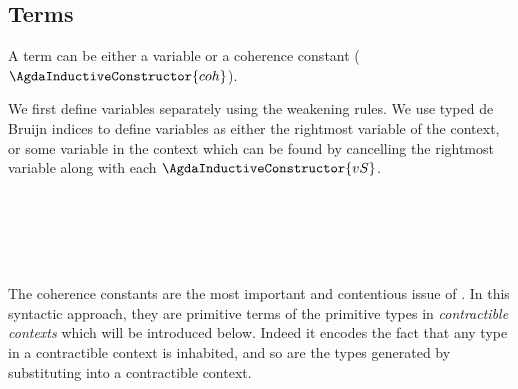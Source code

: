 \subsection{Terms}

A term can be either a variable or a coherence constant ($\AgdaInductiveConstructor{coh}$).

We first define variables separately using the weakening rules. We
use typed de Bruijn indices to define variables as either the rightmost
variable of the context, or some variable in the context which can be
found by cancelling the rightmost variable along with each $\AgdaInductiveConstructor{vS}$.

\begin{code}\>\<%
\\
\>  \<%
\\
\>[0]\<[2]%
\>[2] \AgdaSymbol{:} \AgdaSymbol{\}\{} \AgdaSymbol{:}  \AgdaSymbol{\}} \<[35]%
\>[35]  \AgdaSymbol{(}  \AgdaSymbol{)}\<%
\\
\>[0]\<[2]%
\>[2] \AgdaSymbol{:} \AgdaSymbol{\}\{}  \AgdaSymbol{:}  \AgdaSymbol{\}(} \AgdaSymbol{:}  \AgdaSymbol{)}   \AgdaSymbol{(}  \AgdaSymbol{)}\<%
\\
\>\<\end{code}

The coherence constants are the most important and contentious issue of \wog. In this syntactic approach, they are primitive terms of the primitive types in \emph{contractible contexts}
which will be introduced below. Indeed it encodes the fact that any type in a contractible context is inhabited, and so are the types generated by substituting into a contractible context.

